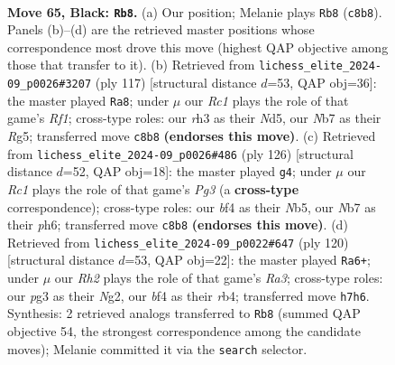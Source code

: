 \documentclass[11pt]{article}
\begin{document}
\clearpage

\begin{figure}[p]\centering
\begin{subfigure}{0.46\textwidth}\centering
\resizebox{\linewidth}{!}{%
\newchessgame
\chessboard[
  setfen={2r5/pn4kr/1p2p3/4P2p/2P2B2/2K3PR/P1N2R2/8 b - - 2 65},
  showmover=false,
  pgfstyle=straightmove, color=movearrow, markmove={c8-b8}
]}
\caption{}
\end{subfigure}\hfill
\begin{subfigure}{0.46\textwidth}\centering
\resizebox{\linewidth}{!}{%
\newchessgame
\chessboard[
  setfen={5r2/6pk/6p1/1P1n2r1/4p3/1R2P3/2R1BP1P/5K2 b - - 16 59},
  showmover=false,
  pgfstyle=straightmove, color=movearrow, markmove={f8-a8}
]}
\caption{}
\end{subfigure}
\\[4pt]
\begin{subfigure}{0.46\textwidth}\centering
\resizebox{\linewidth}{!}{%
\newchessgame
\chessboard[
  setfen={5bk1/1p4p1/1p3rPp/1N3P2/P7/6P1/3R2K1/8 w - - 1 64},
  showmover=false,
  pgfstyle=straightmove, color=movearrow, markmove={g3-g4}
]}
\caption{}
\end{subfigure}\hfill
\begin{subfigure}{0.46\textwidth}\centering
\resizebox{\linewidth}{!}{%
\newchessgame
\chessboard[
  setfen={r7/P7/1kp3p1/5bP1/1r5p/R7/5PNK/R7 w - - 0 61},
  showmover=false,
  pgfstyle=straightmove, color=movearrow, markmove={a3-a6}
]}
\caption{}
\end{subfigure}
\caption{\textbf{Move 65, Black: \texttt{Rb8}.} (a) Our position; Melanie plays \texttt{Rb8} (\texttt{c8b8}). Panels (b)--(d) are the retrieved master positions whose correspondence most drove this move (highest QAP objective among those that transfer to it). (b) Retrieved from \texttt{lichess\_elite\_2024-09\_p0026\#3207} (ply 117) [structural distance $d$=53, QAP obj=36]: the master played \texttt{Ra8}; under $\mu$ our \emph{Rc1} plays the role of that game's \emph{Rf1}; cross-type roles: our \emph{r}h3 as their \emph{N}d5, our \emph{N}b7 as their \emph{R}g5; transferred move \texttt{c8b8} \textbf{(endorses this move)}. (c) Retrieved from \texttt{lichess\_elite\_2024-09\_p0026\#486} (ply 126) [structural distance $d$=52, QAP obj=18]: the master played \texttt{g4}; under $\mu$ our \emph{Rc1} plays the role of that game's \emph{Pg3} (a \textbf{cross-type} correspondence); cross-type roles: our \emph{b}f4 as their \emph{N}b5, our \emph{N}b7 as their \emph{p}h6; transferred move \texttt{c8b8} \textbf{(endorses this move)}. (d) Retrieved from \texttt{lichess\_elite\_2024-09\_p0022\#647} (ply 120) [structural distance $d$=53, QAP obj=22]: the master played \texttt{Ra6+}; under $\mu$ our \emph{Rh2} plays the role of that game's \emph{Ra3}; cross-type roles: our \emph{p}g3 as their \emph{N}g2, our \emph{b}f4 as their \emph{r}b4; transferred move \texttt{h7h6}. Synthesis: 2 retrieved analogs transferred to \texttt{Rb8} (summed QAP objective 54, the strongest correspondence among the candidate moves); Melanie committed it via the \texttt{search} selector.}
\label{fig:thought-m129}
\end{figure}
\end{document}
